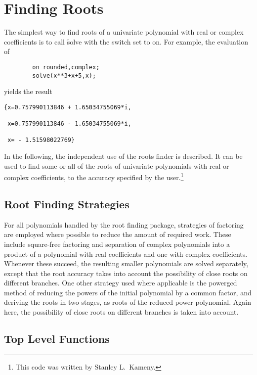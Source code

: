 \section{Finding Roots}
\hypertarget{package:ROOTS}{}

The simplest way to find roots of a univariate polynomial with real
or complex coefficients is to call \f{solve} with the switch
 set to on. For example, the evaluation of
\begin{verbatim}
        on rounded,complex;
        solve(x**3+x+5,x);
\end{verbatim}
yields the result
\begin{verbatim}
{x=0.757990113846 + 1.65034755069*i,

 x=0.757990113846 - 1.65034755069*i,

 x= - 1.51598022769}
\end{verbatim}

In the following, the independent use of the roots finder is
described. It can be used to find some or all of the roots of
univariate polynomials with real or complex coefficients, to the
accuracy specified by the user.\footnote{This code was written by Stanley L.~Kameny.}

\subsection{Root Finding Strategies}

For all polynomials handled by the root finding package, strategies of
factoring are employed where possible to reduce the amount of required
work.  These include square-free factoring and separation of complex
polynomials into a product of a polynomial with real coefficients and one
with complex coefficients.  Whenever these succeed, the resulting smaller
polynomials are solved separately, except that the root accuracy takes
into account the possibility of close roots on different branches.  One
other strategy used where applicable is the powergcd method of reducing
the powers of the initial polynomial by a common factor, and deriving the
roots in two stages, as roots of the reduced power polynomial.  Again
here, the possibility of close roots on different branches is taken into
account.

\subsection{Top Level Functions}

